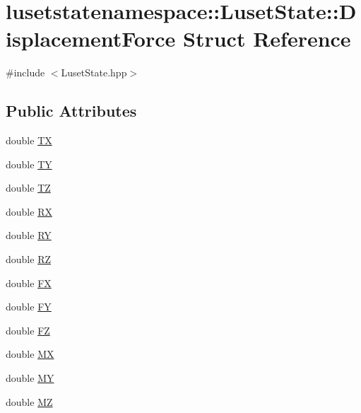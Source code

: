 \hypertarget{structlusetstatenamespace_1_1LusetState_1_1DisplacementForce}{}\section{lusetstatenamespace\+:\+:Luset\+State\+:\+:Displacement\+Force Struct Reference}
\label{structlusetstatenamespace_1_1LusetState_1_1DisplacementForce}


{\ttfamily \#include $<$Luset\+State.\+hpp$>$}

\subsection*{Public Attributes}
\begin{DoxyCompactItemize}
\item 
double \hyperlink{structlusetstatenamespace_1_1LusetState_1_1DisplacementForce_a7a37f3b5b97fce9d90bde1fe25b617da}{TX}
\item 
double \hyperlink{structlusetstatenamespace_1_1LusetState_1_1DisplacementForce_a38d725301744ad25fb76c49eb72991b2}{TY}
\item 
double \hyperlink{structlusetstatenamespace_1_1LusetState_1_1DisplacementForce_a030aee8f699268e128240af15f9f83bc}{TZ}
\item 
double \hyperlink{structlusetstatenamespace_1_1LusetState_1_1DisplacementForce_ad67be47963a60232dc83d1409ef7a5b7}{RX}
\item 
double \hyperlink{structlusetstatenamespace_1_1LusetState_1_1DisplacementForce_aa33ddf5cee2423b5c7c09b8874d99961}{RY}
\item 
double \hyperlink{structlusetstatenamespace_1_1LusetState_1_1DisplacementForce_a4ba406cc41ab611f05f77e07b379e4ca}{RZ}
\item 
double \hyperlink{structlusetstatenamespace_1_1LusetState_1_1DisplacementForce_a6bb12bdce743054a0ecb7ac7b1a31d76}{FX}
\item 
double \hyperlink{structlusetstatenamespace_1_1LusetState_1_1DisplacementForce_ae3766871684d8f67747cdf87f4a5d7ef}{FY}
\item 
double \hyperlink{structlusetstatenamespace_1_1LusetState_1_1DisplacementForce_a2d5a62cc121631985b26910b84c82466}{FZ}
\item 
double \hyperlink{structlusetstatenamespace_1_1LusetState_1_1DisplacementForce_a6853182466be2cc630f3a4835df41abe}{MX}
\item 
double \hyperlink{structlusetstatenamespace_1_1LusetState_1_1DisplacementForce_a8e085f192b400a9ffc9c838fbc1fcb47}{MY}
\item 
double \hyperlink{structlusetstatenamespace_1_1LusetState_1_1DisplacementForce_a3372261f4ea19e6de30e336611409248}{MZ}
\end{DoxyCompactItemize}


